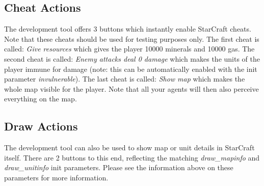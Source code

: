 \subsection{Cheat Actions}
The development tool offers 3 buttons which instantly enable StarCraft cheats. Note that these cheats should be used for testing purposes only. The first cheat is called: \textit{Give resources} which gives the player 10000 minerals and 10000 gas. The second cheat is called: \textit{Enemy attacks deal 0 damage} which makes the units of the player immune for damage (note: this can be automatically enabled with the init parameter \textit{invulnerable}). The last cheat is called: \textit{Show map} which makes the whole map visible for the player. Note that all your agents will then also perceive everything on the map.

\subsection{Draw Actions}
The development tool can also be used to show map or unit details in StarCraft itself. There are 2 buttons to this end, reflecting the matching \textit{draw\_mapinfo} and \textit{draw\_unitinfo} init parameters. Please see the information above on these parameters for more information.